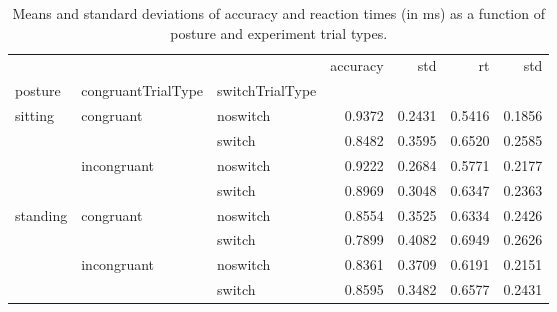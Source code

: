 \begin{table}
\centering
\caption{Means and standard deviations of accuracy and reaction times (in ms) as a function of posture and experiment trial types.}
\label{table-task-switching-replication-reaction-time}
\begin{tabular}{lllrrrr}
\toprule
         &             &        & accuracy &    std &     rt &    std \\
posture & congruantTrialType & switchTrialType &          &        &        &        \\
\midrule
sitting & congruant & noswitch &   0.9372 & 0.2431 & 0.5416 & 0.1856 \\
         &             & switch &   0.8482 & 0.3595 & 0.6520 & 0.2585 \\
         & incongruant & noswitch &   0.9222 & 0.2684 & 0.5771 & 0.2177 \\
         &             & switch &   0.8969 & 0.3048 & 0.6347 & 0.2363 \\
standing & congruant & noswitch &   0.8554 & 0.3525 & 0.6334 & 0.2426 \\
         &             & switch &   0.7899 & 0.4082 & 0.6949 & 0.2626 \\
         & incongruant & noswitch &   0.8361 & 0.3709 & 0.6191 & 0.2151 \\
         &             & switch &   0.8595 & 0.3482 & 0.6577 & 0.2431 \\
\bottomrule
\end{tabular}
\end{table}
